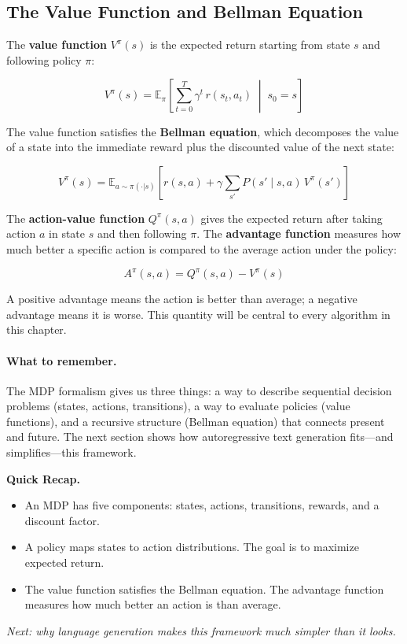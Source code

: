 \subsection{The Value Function and Bellman Equation}

The \textbf{value function} $V^\pi(s)$ is the expected return starting from state $s$ and following policy $\pi$:

\begin{equation}
\label{eq:value}
V^\pi(s) = \mathbb{E}_\pi\!\left[\sum_{t=0}^{T} \gamma^t \, r(s_t, a_t) \;\middle|\; s_0 = s\right]
\end{equation}

The value function satisfies the \textbf{Bellman equation}, which decomposes the value of a state into the immediate reward plus the discounted value of the next state:

\begin{equation}
\label{eq:bellman}
V^\pi(s) = \mathbb{E}_{a \sim \pi(\cdot|s)}\!\left[r(s, a) + \gamma \sum_{s'} P(s' \mid s, a) \, V^\pi(s')\right]
\end{equation}

The \textbf{action-value function} $Q^\pi(s, a)$ gives the expected return after taking action $a$ in state $s$ and then following $\pi$. The \textbf{advantage function} measures how much better a specific action is compared to the average action under the policy:

\begin{equation}
\label{eq:advantage}
A^\pi(s, a) = Q^\pi(s, a) - V^\pi(s)
\end{equation}

A positive advantage means the action is better than average; a negative advantage means it is worse. This quantity will be central to every algorithm in this chapter.

\paragraph{What to remember.} The MDP formalism gives us three things: a way to describe sequential decision problems (states, actions, transitions), a way to evaluate policies (value functions), and a recursive structure (Bellman equation) that connects present and future. The next section shows how autoregressive text generation fits---and simplifies---this framework.

\begin{quickrecap}
\textbf{Quick Recap.}
\begin{itemize}[nosep,leftmargin=1.5em]
  \item An MDP has five components: states, actions, transitions, rewards, and a discount factor.
  \item A policy maps states to action distributions. The goal is to maximize expected return.
  \item The value function satisfies the Bellman equation. The advantage function measures how much better an action is than average.
\end{itemize}
\textit{Next: why language generation makes this framework much simpler than it looks.}
\end{quickrecap}


